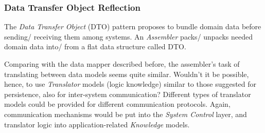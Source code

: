 %
%
%
%
%
%
%

\subsubsection{Data Transfer Object Reflection}
\label{data_transfer_object_reflection_heading}

The \emph{Data Transfer Object} (DTO) pattern proposes to bundle domain data
before sending/ receiving them among systems. An \emph{Assembler} packs/
unpacks needed domain data into/ from a flat data structure called DTO.

Comparing with the data mapper described before, the assembler's task of
translating between data models seems quite similar. Wouldn't it be possible,
hence, to use \emph{Translator} models (logic knowledge) similar to those
suggested for persistence, also for inter-system communication? Different types
of translator models could be provided for different communication protocols.
Again, communication mechanisms would be put into the \emph{System Control}
layer, and translator logic into application-related \emph{Knowledge} models.
